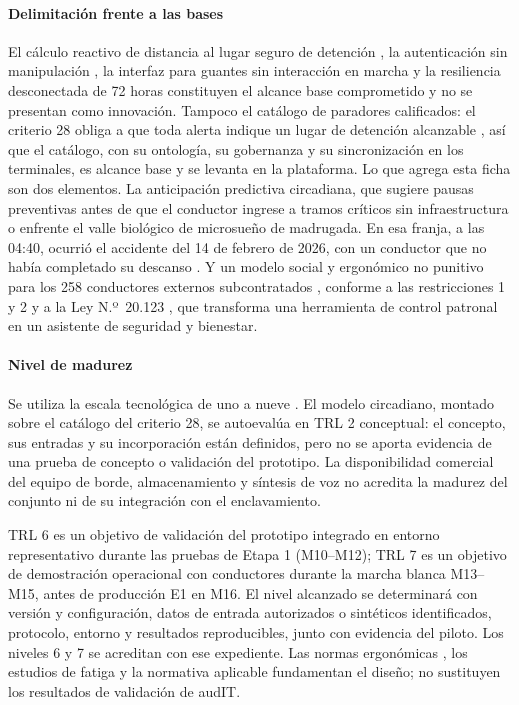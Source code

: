 \paragraph{Delimitación frente a las bases} El cálculo reactivo de distancia al lugar seguro de
detención , la autenticación sin manipulación , la interfaz
para guantes sin interacción en marcha  y la resiliencia desconectada de 72 horas
 constituyen el alcance base comprometido y no se presentan como
innovación. Tampoco el catálogo de paradores calificados: el criterio 28 obliga a que toda alerta
indique un lugar de detención alcanzable , así que el catálogo, con su
ontología, su gobernanza y su sincronización en los terminales, es alcance base y se levanta en la
plataforma. Lo que agrega esta ficha son dos elementos. La anticipación predictiva circadiana, que
sugiere pausas preventivas antes de que el conductor ingrese a tramos críticos sin infraestructura o
enfrente el valle biológico de microsueño de madrugada. En esa franja, a las 04:40, ocurrió el
accidente del 14 de febrero de 2026, con un conductor que no había completado su descanso
. Y un modelo social y ergonómico no punitivo
para los 258 conductores externos subcontratados , conforme a las restricciones 1
y 2  y a la Ley N.º~20.123 \parencite{ley20123}, que transforma una herramienta de control patronal en
un asistente de seguridad y bienestar.

\paragraph{Nivel de madurez} Se utiliza la escala tecnológica de uno a nueve \parencite{iso16290}. El modelo circadiano, montado sobre el catálogo del criterio 28, se autoevalúa en TRL 2 conceptual: el concepto, sus entradas y su incorporación están definidos, pero no se aporta evidencia de una prueba de concepto o validación del prototipo. La disponibilidad comercial del equipo de borde, almacenamiento y síntesis de voz no acredita la madurez del conjunto ni de su integración con el enclavamiento.

TRL 6 es un objetivo de validación del prototipo integrado en entorno representativo durante las pruebas de Etapa 1 (M10--M12); TRL 7 es un objetivo de demostración operacional con conductores durante la marcha blanca M13--M15, antes de producción E1 en M16. El nivel alcanzado se determinará con versión y configuración, datos de entrada autorizados o sintéticos identificados, protocolo, entorno y resultados reproducibles, junto con evidencia del piloto. Los niveles 6 y 7 se acreditan con ese expediente. Las normas ergonómicas \parencite{iso15005,iso9241_210}, los estudios de fatiga \parencite{nasem2016_fatiga} y la normativa aplicable \parencite{ley21377,codigo_trabajo_25bis} fundamentan el diseño; no sustituyen los resultados de validación de audIT.

